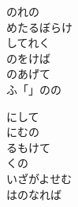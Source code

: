 \documentclass[10pt,b5j]{tarticle} %
\begin{document}
\begin{enumerate}
\begin{minipage}[c]{\blocksize}
        \vspace{\linespace}
        \item
        のれの\\
        めたるぼらけ\\
        してれく\\
        のをけば\\
        のあげて\\
        ふ「」のの
        
        \vspace{\linespace}
        \item
        にして\\
        にむの\\
        るもけて\\
        くの\\
        いざがよせむ\\
        はのなれば
    
    \end{minipage}
\end{enumerate} %
\end{document}
